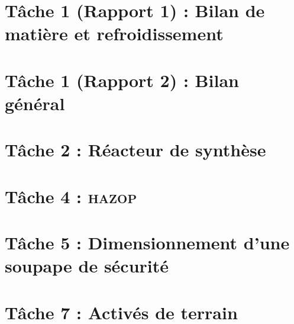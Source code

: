 \documentclass[a4paper,oneside,12pt]{report}
\begin{document}


\tableofcontents

\chapter{T\^ache 1 (Rapport 1) : Bilan de matière et refroidissement}


\chapter{T\^ache 1 (Rapport 2) : Bilan général} 


\chapter{T\^ache 2 : Réacteur de synthèse}


\chapter{T\^ache 4 : \textsc{hazop}}


\chapter{T\^ache 5 : Dimensionnement d'une soupape de sécurité}


\chapter{T\^ache 7 : Activés de terrain}


\nocite{*}
\printbibliography
\end{document}
